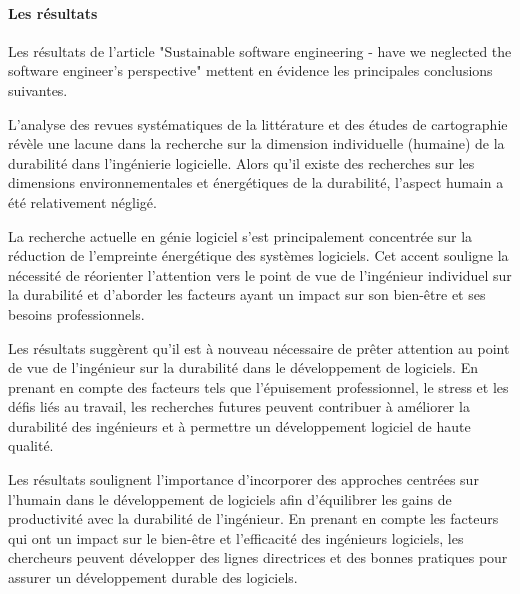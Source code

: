 \paragraph{Les résultats}
Les résultats de l'article "Sustainable software engineering - have we neglected the software engineer's perspective" mettent en évidence les principales conclusions suivantes.

L'analyse des revues systématiques de la littérature et des études de cartographie révèle une lacune dans la recherche sur la dimension individuelle (humaine) de la durabilité dans l'ingénierie logicielle. Alors qu'il existe des recherches sur les dimensions environnementales et énergétiques de la durabilité, l'aspect humain a été relativement négligé.

La recherche actuelle en génie logiciel s'est principalement concentrée sur la réduction de l'empreinte énergétique des systèmes logiciels. Cet accent souligne la nécessité de réorienter l'attention vers le point de vue de l'ingénieur individuel sur la durabilité et d'aborder les facteurs ayant un impact sur son bien-être et ses besoins professionnels.

Les résultats suggèrent qu'il est à nouveau nécessaire de prêter attention au point de vue de l'ingénieur sur la durabilité dans le développement de logiciels. En prenant en compte des facteurs tels que l'épuisement professionnel, le stress et les défis liés au travail, les recherches futures peuvent contribuer à améliorer la durabilité des ingénieurs et à permettre un développement logiciel de haute qualité.

Les résultats soulignent l'importance d'incorporer des approches centrées sur l'humain dans le développement de logiciels afin d'équilibrer les gains de productivité avec la durabilité de l'ingénieur. En prenant en compte les facteurs qui ont un impact sur le bien-être et l'efficacité des ingénieurs logiciels, les chercheurs peuvent développer des lignes directrices et des bonnes pratiques pour assurer un développement durable des logiciels.